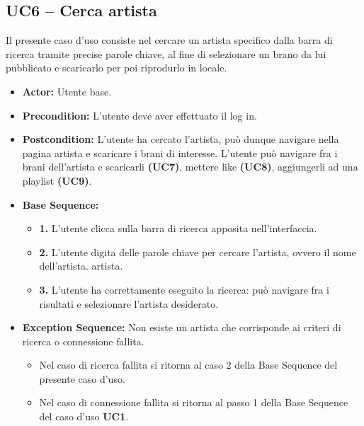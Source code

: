 \subsection{UC6 -- Cerca artista}
Il presente caso d'uso consiste nel cercare un artista specifico dalla barra di ricerca
tramite precise parole chiave, al fine di selezionare un brano da lui pubblicato e scaricarlo per poi riprodurlo in locale.
\begin{itemize}
    \item \textbf{Actor:} Utente base.
    \item \textbf{Precondition:} L'utente deve aver effettuato il log in. 
    \item \textbf{Postcondition:} L'utente ha cercato l'artista, può dunque navigare nella pagina 
    artista e scaricare i brani di interesse. L'utente può navigare fra i brani dell'artista e 
    scaricarli \textbf{(UC7)}, mettere like \textbf{(UC8)}, aggiungerli ad una playlist \textbf{(UC9)}.
    \item \textbf{Base Sequence:}
    \begin{itemize}
        \item \textbf{1.} L'utente clicca sulla barra di ricerca apposita nell'interfaccia.
        \item \textbf{2.} L'utente digita delle parole chiave per cercare l'artista, ovvero il nome dell'artista.
        artista.
        \item \textbf{3.} L'utente ha correttamente eseguito la ricerca: può navigare fra i risultati e selezionare l'artista desiderato.
    \end{itemize}
    \item \textbf{Exception Sequence:} Non esiste un artista che corrisponde ai criteri di ricerca o connessione fallita.
    \begin{itemize}
        \item Nel caso di ricerca fallita si ritorna al caso 2 della Base Sequence del presente caso d'uso.
        \item Nel caso di connessione fallita si ritorna al passo 1 della Base Sequence del caso d'uso \textbf{UC1}.
    \end{itemize}
\end{itemize}
\vspace{1cm}

